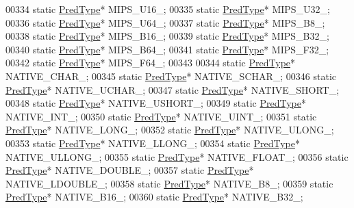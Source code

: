 \begin{DoxyCode}
00334         \textcolor{keyword}{static} \hyperlink{class_h5_1_1_pred_type}{PredType}* MIPS\_U16\_;
00335         \textcolor{keyword}{static} \hyperlink{class_h5_1_1_pred_type}{PredType}* MIPS\_U32\_;
00336         \textcolor{keyword}{static} \hyperlink{class_h5_1_1_pred_type}{PredType}* MIPS\_U64\_;
00337         \textcolor{keyword}{static} \hyperlink{class_h5_1_1_pred_type}{PredType}* MIPS\_B8\_;
00338         \textcolor{keyword}{static} \hyperlink{class_h5_1_1_pred_type}{PredType}* MIPS\_B16\_;
00339         \textcolor{keyword}{static} \hyperlink{class_h5_1_1_pred_type}{PredType}* MIPS\_B32\_;
00340         \textcolor{keyword}{static} \hyperlink{class_h5_1_1_pred_type}{PredType}* MIPS\_B64\_;
00341         \textcolor{keyword}{static} \hyperlink{class_h5_1_1_pred_type}{PredType}* MIPS\_F32\_;
00342         \textcolor{keyword}{static} \hyperlink{class_h5_1_1_pred_type}{PredType}* MIPS\_F64\_;
00343 
00344         \textcolor{keyword}{static} \hyperlink{class_h5_1_1_pred_type}{PredType}* NATIVE\_CHAR\_;
00345         \textcolor{keyword}{static} \hyperlink{class_h5_1_1_pred_type}{PredType}* NATIVE\_SCHAR\_;
00346         \textcolor{keyword}{static} \hyperlink{class_h5_1_1_pred_type}{PredType}* NATIVE\_UCHAR\_;
00347         \textcolor{keyword}{static} \hyperlink{class_h5_1_1_pred_type}{PredType}* NATIVE\_SHORT\_;
00348         \textcolor{keyword}{static} \hyperlink{class_h5_1_1_pred_type}{PredType}* NATIVE\_USHORT\_;
00349         \textcolor{keyword}{static} \hyperlink{class_h5_1_1_pred_type}{PredType}* NATIVE\_INT\_;
00350         \textcolor{keyword}{static} \hyperlink{class_h5_1_1_pred_type}{PredType}* NATIVE\_UINT\_;
00351         \textcolor{keyword}{static} \hyperlink{class_h5_1_1_pred_type}{PredType}* NATIVE\_LONG\_;
00352         \textcolor{keyword}{static} \hyperlink{class_h5_1_1_pred_type}{PredType}* NATIVE\_ULONG\_;
00353         \textcolor{keyword}{static} \hyperlink{class_h5_1_1_pred_type}{PredType}* NATIVE\_LLONG\_;
00354         \textcolor{keyword}{static} \hyperlink{class_h5_1_1_pred_type}{PredType}* NATIVE\_ULLONG\_;
00355         \textcolor{keyword}{static} \hyperlink{class_h5_1_1_pred_type}{PredType}* NATIVE\_FLOAT\_;
00356         \textcolor{keyword}{static} \hyperlink{class_h5_1_1_pred_type}{PredType}* NATIVE\_DOUBLE\_;
00357         \textcolor{keyword}{static} \hyperlink{class_h5_1_1_pred_type}{PredType}* NATIVE\_LDOUBLE\_;
00358         \textcolor{keyword}{static} \hyperlink{class_h5_1_1_pred_type}{PredType}* NATIVE\_B8\_;
00359         \textcolor{keyword}{static} \hyperlink{class_h5_1_1_pred_type}{PredType}* NATIVE\_B16\_;
00360         \textcolor{keyword}{static} \hyperlink{class_h5_1_1_pred_type}{PredType}* NATIVE\_B32\_;

\end{DoxyCode}
